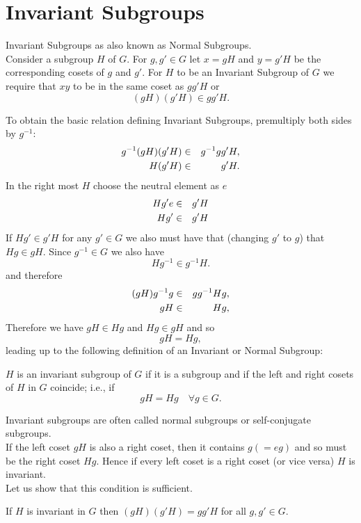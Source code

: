 \section{Invariant Subgroups}

Invariant Subgroups as also known as Normal Subgroups. \\

Consider a subgroup $H$ of $G$. For $g, g' \in G$ let $x = gH$ and $y = g'H$ be the corresponding cosets of $g$ and $g'$. For $H$ to be an Invariant Subgroup of $G$ we require
that $xy$ to be in the same coset as $gg'H$ or \[(gH) (g'H) \in gg'H.\] 

To obtain the basic relation defining Invariant Subgroups, premultiply both sides by $g^{-1}$:
\begin{eqnarray*}
g^{-1} (gH) (g'H) &\in& g^{-1}gg'H, \cr
H (g' H) &\in& g'H. \cr
\end{eqnarray*} 
In the right most $H$ choose the neutral element as $e$ 
\begin{eqnarray*}
Hg' e &\in& g'H \cr
Hg'   &\in& g' H \cr
\end{eqnarray*}  If $Hg'\in g'H$ for any $g'\in G$ we also must have that (changing $g'$ to $g$) that $Hg \in gH$. Since $g^{-1} \in G$ we also have 
\[ Hg^{-1} \in g^{-1} H.\] and therefore
\begin{eqnarray*}
 (gH)g^{-1}g &\in& gg^{-1} Hg,\cr
 gH &\in& Hg,
 \end{eqnarray*}
 Therefore we have $gH \in Hg$ and $Hg \in gH$ and so \[ gH = Hg,\] leading up to the following definition of an Invariant or Normal Subgroup: 
\begin{definition}
$H$ is an invariant subgroup of $G$ if it is a subgroup and if the left and right cosets of $H$ in $G$ coincide; i.e., if 
\[ gH = Hg \quad \forall g \in G.\]
\end{definition}

Invariant subgroups are often called normal subgroups or self-conjugate subgroups. \\

If the left coset $gH$ is also a right coset, then it contains  $g (= eg)$ and so must be the right coset $Hg$. Hence if every left coset is a right coset (or vice versa) $H$ is invariant.\\

Let us show that this condition is sufficient.
\begin{theorem}
If $H$ is invariant in $G$ then $(gH) (g'H) = g g' H$ for all $g,g' \in G$. 
\end{theorem} 

